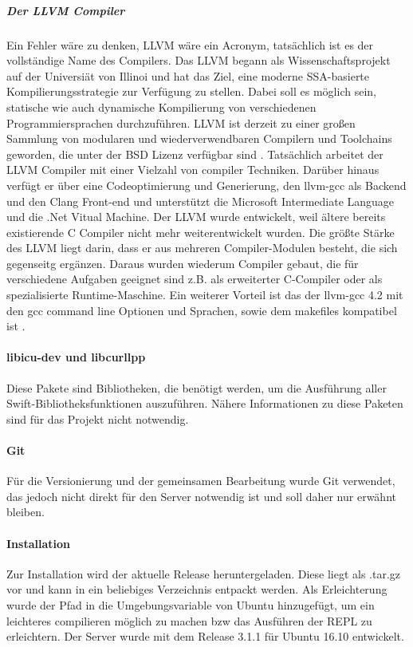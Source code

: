\subparagraph{Der LLVM Compiler}
Ein Fehler wäre zu denken, LLVM wäre ein Acronym, tatsächlich ist es der vollständige Name des Compilers. Das LLVM begann als Wissenschaftsprojekt auf der Universiät von Illinoi und hat das Ziel, eine moderne SSA-basierte Kompilierungsstrategie zur Verfügung zu stellen. Dabei soll es möglich sein, statische wie auch dynamische Kompilierung von verschiedenen Programmiersprachen durchzuführen. LLVM ist derzeit zu einer großen Sammlung von modularen und wiederverwendbaren Compilern und Toolchains geworden, die unter der BSD Lizenz verfügbar sind \parencite{llvm}. Tatsächlich arbeitet der LLVM Compiler mit einer Vielzahl von compiler Techniken. Darüber hinaus verfügt er über eine Codeoptimierung und Generierung, den llvm-gcc als Backend und den Clang Front-end und unterstützt die Microsoft Intermediate Language und die .Net Vitual Machine. Der LLVM wurde entwickelt, weil ältere bereits existierende C Compiler nicht mehr weiterentwickelt wurden. Die größte Stärke des LLVM liegt darin, dass er aus mehreren Compiler-Modulen besteht, die sich gegenseitg ergänzen. Daraus wurden wiederum Compiler gebaut, die für verschiedene Aufgaben geeignet sind z.B. als erweiterter C-Compiler oder als spezialisierte Runtime-Maschine. Ein weiterer Vorteil ist das der llvm-gcc 4.2 mit den gcc command line Optionen und Sprachen, sowie dem makefiles kompatibel ist \parencite{llvmpulbic}.

\paragraph{libicu-dev und libcurllpp}
Diese Pakete sind Bibliotheken, die benötigt werden, um die Ausführung aller Swift-Bibliotheksfunktionen auszuführen. Nähere Informationen zu diese Paketen sind für das Projekt nicht notwendig.

\paragraph{Git}
Für die Versionierung und der gemeinsamen Bearbeitung wurde Git verwendet, das jedoch nicht direkt für den Server notwendig ist und soll daher nur erwähnt bleiben.

\paragraph{Installation}
Zur Installation wird der aktuelle Release heruntergeladen. Diese liegt als .tar.gz vor und kann in ein beliebiges Verzeichnis entpackt werden. Als Erleichterung wurde der Pfad in die Umgebungsvariable von Ubuntu hinzugefügt, um ein leichteres compilieren möglich zu machen bzw das Ausführen der REPL zu erleichtern. Der Server wurde mit dem Release 3.1.1 für Ubuntu 16.10 entwickelt.

